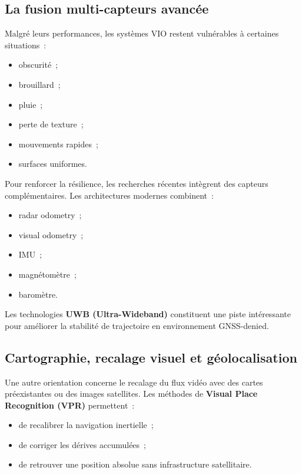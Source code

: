\documentclass[12pt, a4paper, twoside, openright]{report}
\begin{document}
\subsection{La fusion multi-capteurs avancée}

Malgré leurs performances, les systèmes VIO restent vulnérables à certaines situations~:

\begin{itemize}
    \item obscurité~;
    \item brouillard~;
    \item pluie~;
    \item perte de texture~;
    \item mouvements rapides~;
    \item surfaces uniformes.
\end{itemize}

Pour renforcer la résilience, les recherches récentes intègrent des capteurs complémentaires. Les architectures modernes combinent~:

\begin{itemize}
    \item radar odometry~;
    \item visual odometry~;
    \item IMU~;
    \item magnétomètre~;
    \item baromètre.
\end{itemize}

Les technologies \textbf{UWB (Ultra-Wideband)} constituent une piste intéressante pour améliorer la stabilité de trajectoire en environnement GNSS-denied.

\subsection{Cartographie, recalage visuel et géolocalisation}

Une autre orientation concerne le recalage du flux vidéo avec des cartes préexistantes ou des images satellites. Les méthodes de \textbf{Visual Place Recognition (VPR)} permettent~:

\begin{itemize}
    \item de recalibrer la navigation inertielle~;
    \item de corriger les dérives accumulées~;
    \item de retrouver une position absolue sans infrastructure satellitaire.
\end{itemize}
\end{document}
